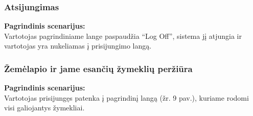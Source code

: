 \documentclass{VUMIFPSkursinis}
\begin{document}
\subsubsection{Atsijungimas}
	\textbf{Pagrindinis scenarijus:}\\
	Vartotojas pagrindiniame lange paspaudžia “Log Off”, sistema jį atjungia ir vartotojas yra nukeliamas į prisijungimo langą.

\subsubsection{Žemėlapio ir jame esančių žymeklių peržiūra}
	\textbf{Pagrindinis scenarijus:}\\
	Vartotojas prisijungęs patenka į pagrindinį langą (žr. 9 pav.), kuriame rodomi visi galiojantys žymekliai.
\end{document}
